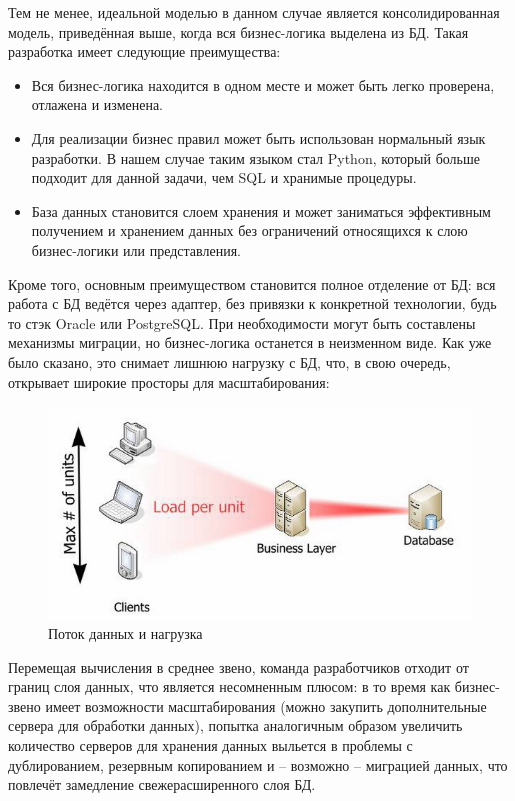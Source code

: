 \documentclass[14pt, a4paper]{extreport}
\begin{document}
Тем не менее, идеальной моделью в данном случае является консолидированная модель, приведённая выше, когда вся бизнес-логика выделена из БД. Такая разработка имеет следующие преимущества:

\begin{itemize}
  \item Вся бизнес-логика находится в одном месте и может быть легко проверена, отлажена и изменена.
  \item Для реализации бизнес правил может быть использован нормальный язык разработки. В нашем случае таким языком стал Python, который больше подходит для данной задачи, чем SQL и хранимые процедуры.
  \item База данных становится слоем хранения и может заниматься эффективным получением и хранением данных без ограничений относящихся к слою бизнес-логики или представления.
\end{itemize}

Кроме того, основным преимуществом становится полное отделение от БД: вся работа с БД ведётся через адаптер, без привязки к конкретной технологии, будь то стэк Oracle или PostgreSQL. При необходимости могут быть составлены механизмы миграции, но бизнес-логика останется в неизменном виде. Как уже было сказано, это снимает лишнюю нагрузку с БД, что, в свою очередь, открывает широкие просторы для масштабирования:

\begin{figure}[!htb]
  \centering
    \includegraphics[scale=0.5]{../shared_images/business-logic/scaling.jpg}
   \caption{Поток данных и нагрузка}
    \label{fig:start}
\end{figure}

Перемещая вычисления в среднее звено, команда разработчиков отходит от границ слоя данных, что является несомненным плюсом: в то время как бизнес-звено имеет возможности масштабирования (можно закупить дополнительные сервера для обработки данных), попытка аналогичным образом увеличить количество серверов для хранения данных выльется в проблемы с дублированием, резервным копированием и -- возможно -- миграцией данных, что повлечёт замедление свежерасширенного слоя БД.
\end{document}
